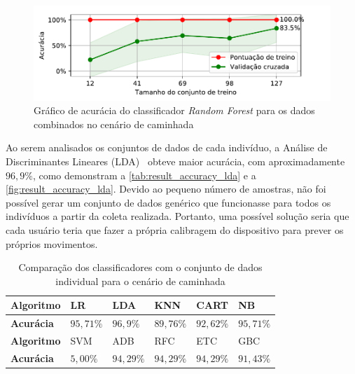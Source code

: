 \begin{figure}[ht]
	\caption{\label{fig:result_accuracy_rfc}Gráfico de acurácia do classificador \textit{Random Forest} para os dados combinados no cenário de caminhada}
	\begin{center}
		\includegraphics[width=\textwidth]{resources/result_accuracy_rfc}
	\end{center}
\end{figure}

\newpage

Ao serem analisados os conjuntos de dados de cada indivíduo, a Análise de Discriminantes Lineares (LDA)~\cite{scikit:lda} obteve maior acurácia, com aproximadamente \(96{,}9\%\), como demonstram a \autoref{tab:result_accuracy_lda} e a \autoref{fig:result_accuracy_lda}. Devido ao pequeno número de amostras, não foi possível gerar um conjunto de dados genérico que funcionasse para todos os indivíduos a partir da coleta realizada. Portanto, uma possível solução seria que cada usuário teria que fazer a própria calibragem do dispositivo para prever os próprios movimentos.

\begin{table}[ht]
	\caption{Comparação dos classificadores com o conjunto de dados individual para o cenário de caminhada}%
	\label{tab:result_accuracy_lda}
	\begin{tabularx}{\textwidth}{X X X X X X}
		\toprule
		\textbf{Algoritmo} & LR            & LDA           & KNN           & CART          & NB            \\ \midrule
		\textbf{Acurácia}  & \(95{,}71\%\) & \(96{,}9\%\) & \(89{,}76\%\) & \(92{,}62\%\) & \(95{,}71\%\) \\ \bottomrule \toprule
		\textbf{Algoritmo} & SVM           & ADB           & RFC           & ETC           & GBC           \\ \midrule
		\textbf{Acurácia}  & \(5{,}00\%\)  & \(94{,}29\%\) & \(94{,}29\%\) & \(94{,}29\%\) & \(91{,}43\%\) \\ \bottomrule
	\end{tabularx}
\end{table}

